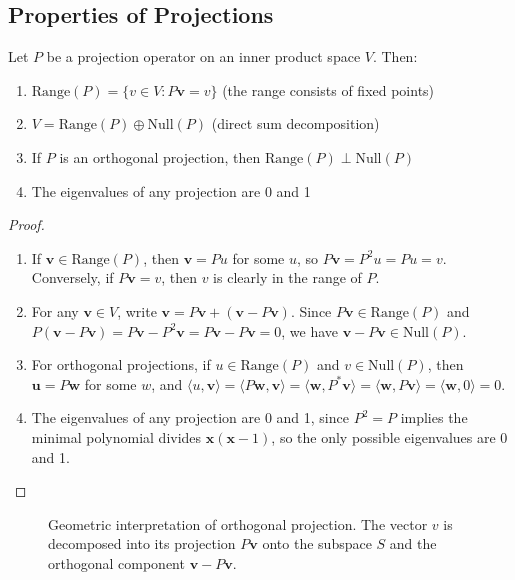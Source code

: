 \subsection{Properties of Projections}
Let $P$ be a projection operator on an inner product space $V$. Then:
\begin{enumerate}
    \item $\text{Range}(P) = \{v  \in  V : P\mathbf{v} = v\}$ (the range consists of fixed points)
    \item $V = \text{Range}(P) \oplus \text{Null}(P)$ (direct sum decomposition)
    \item If $P$ is an orthogonal projection, then $\text{Range}(P) \perp \text{Null}(P)$
    \item The eigenvalues of any projection are 0 and 1
\end{enumerate}
\begin{proof}
    \begin{enumerate}
        \item If $\mathbf{v} \in \text{Range}(P)$, then $\mathbf{v} = Pu$ for some $u$, so $P\mathbf{v} = P^2u = Pu = v$. Conversely, if $P\mathbf{v} = v$, then $v$ is clearly in the range of $P$.
        \item For any $\mathbf{v} \in V$, write $\mathbf{v} = P\mathbf{v} + (\mathbf{v} - P\mathbf{v})$. Since $P\mathbf{v}  \in  \text{Range}(P)$ and $P(\mathbf{v} - P\mathbf{v}) = P\mathbf{v} - P^2 \mathbf{v} = P\mathbf{v} - P\mathbf{v} = 0$, we have $\mathbf{v} - P\mathbf{v}  \in  \text{Null}(P)$.
        \item For orthogonal projections, if $u  \in  \text{Range}(P)$ and $v  \in  \text{Null}(P)$, then $\mathbf{u} =P\mathbf{w}$ for some $w$, and $\langle u, \mathbf{v} \rangle = \langle P\mathbf{w}, \mathbf{v} \rangle = \langle \mathbf{w}, P^{\ast} \mathbf{v} \rangle = \langle \mathbf{w}, P\mathbf{v} \rangle = \langle \mathbf{w}, 0 \rangle = 0$.
        \item The eigenvalues of any projection are 0 and 1, since $P^2 = P$ implies the minimal polynomial divides $\mathbf{x}(\mathbf{x}-1)$, so the only possible eigenvalues are 0 and 1.
    \end{enumerate}
\end{proof}

\begin{figure}[ht]
    \centering
    
    \caption{Geometric interpretation of orthogonal projection. The vector $v$ is decomposed into its projection $P\mathbf{v}$ onto the subspace $S$ and the orthogonal component $\mathbf{v} - P\mathbf{v}$.}
    \label{fig:orthogonal-projection}
\end{figure}

